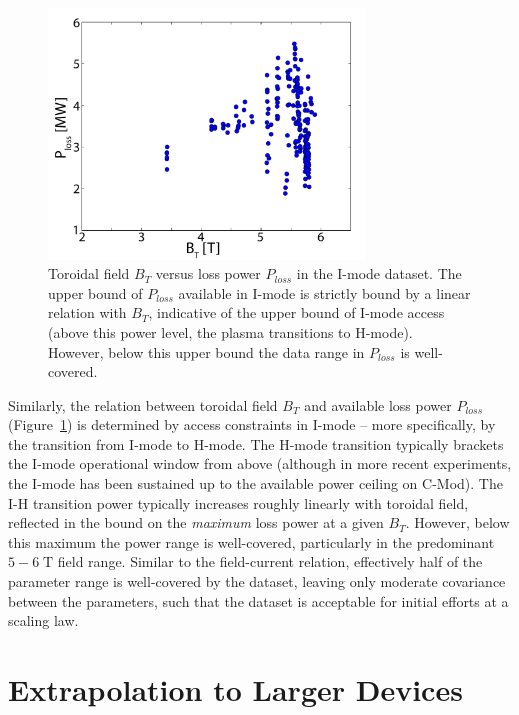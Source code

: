 \documentclass[12pt]{iopart}
\begin{document}
\begin{figure}[ht]
 \centering
 \includegraphics[width=0.75\textwidth]{Bt_Ploss.pdf}
 \caption{Toroidal field $B_T$ versus loss power $P_{loss}$ in the I-mode dataset.  The upper bound of $P_{loss}$ available in I-mode is strictly bound by a linear relation with $B_T$, indicative of the upper bound of I-mode access (above this power level, the plasma transitions to H-mode).  However, below this upper bound the data range in $P_{loss}$ is well-covered.}
 \label{fig:Bt_Ploss}
\end{figure}

Similarly, the relation between toroidal field $B_T$ and available loss power $P_{loss}$ (Figure~\ref{fig:Bt_Ploss}) is determined by access constraints in I-mode -- more specifically, by the transition from I-mode to H-mode.
The H-mode transition typically brackets the I-mode operational window from above (although in more recent experiments, the I-mode has been sustained up to the available power ceiling on C-Mod).
The I-H transition power typically increases roughly linearly with toroidal field, reflected in the bound on the \emph{maximum} loss power at a given $B_T$.
However, below this maximum the power range is well-covered, particularly in the predominant $5-6\;\mbox{T}$ field range.
Similar to the field-current relation, effectively half of the parameter range is well-covered by the dataset, leaving only moderate covariance between the parameters, such that the dataset is acceptable for initial efforts at a scaling law.

\section{Extrapolation to Larger Devices}\label{sec:extrap}
\end{document}
